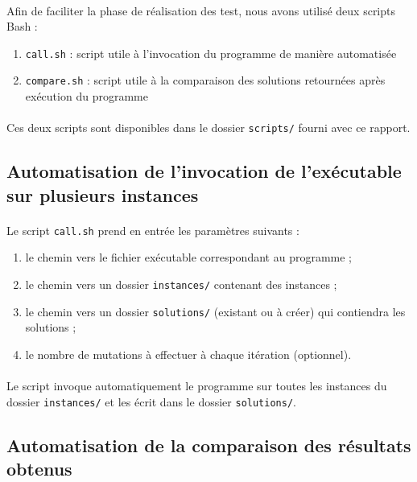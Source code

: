 \paragraph{}
Afin de faciliter la phase de réalisation des test, nous avons utilisé deux scripts Bash :
\begin{enumerate}
\item \texttt{call.sh} : script utile à l'invocation du programme de manière automatisée
\item \texttt{compare.sh} : script utile à la comparaison des solutions retournées après exécution du programme
\end{enumerate}
\paragraph{}
Ces deux scripts sont disponibles dans le dossier \texttt{scripts/} fourni avec ce rapport.

\newpage

\subsection{Automatisation de l'invocation de l'exécutable sur plusieurs instances}

\paragraph{}
Le script \texttt{call.sh} prend en entrée les paramètres suivants :
\begin{enumerate}
\item le chemin vers le fichier exécutable correspondant au programme ;
\item le chemin vers un dossier \texttt{instances/} contenant des instances ;
\item le chemin vers un dossier \texttt{solutions/} (existant ou à créer) qui contiendra les solutions ;
\item le nombre de mutations à effectuer à chaque itération (optionnel).
\end{enumerate}
\paragraph{}
Le script invoque automatiquement le programme sur toutes les instances du dossier \texttt{instances/} et les écrit dans le dossier \texttt{solutions/}.

\subsection{Automatisation de la comparaison des résultats obtenus}

